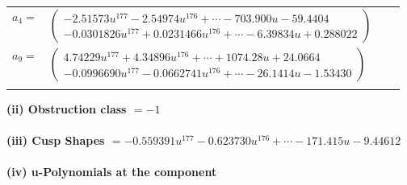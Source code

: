 \documentclass[1p]{elsarticle_modified}
\theoremstyle{definition}
\begin{document}
\begin{tabular}{m{7pt} m{180pt} m{7pt} m{180pt} }
\flushright $a_{4}=$&$\begin{pmatrix}-2.51573 u^{177}-2.54974 u^{176}+\cdots-703.900 u-59.4404\\-0.0301826 u^{177}+0.0231466 u^{176}+\cdots-6.39834 u+0.288022\end{pmatrix}$ \\
\flushright $a_{9}=$&$\begin{pmatrix}4.74229 u^{177}+4.34896 u^{176}+\cdots+1074.28 u+24.0664\\-0.0996690 u^{177}-0.0662741 u^{176}+\cdots-26.1414 u-1.53430\end{pmatrix}$\\&\end{tabular}
\flushleft \textbf{(ii) Obstruction class $= -1$}\\~\\
\flushleft \textbf{(iii) Cusp Shapes $= -0.559391 u^{177}-0.623730 u^{176}+\cdots-171.415 u-9.44612$}\\~\\
\newpage\renewcommand{\arraystretch}{1}
\flushleft \textbf{(iv) u-Polynomials at the component}\newline \\
\end{document}
